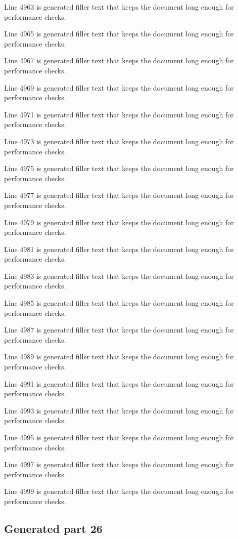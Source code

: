 Line 4963 is generated filler text that keeps the document long enough for performance checks.

Line 4965 is generated filler text that keeps the document long enough for performance checks.

Line 4967 is generated filler text that keeps the document long enough for performance checks.

Line 4969 is generated filler text that keeps the document long enough for performance checks.

Line 4971 is generated filler text that keeps the document long enough for performance checks.

Line 4973 is generated filler text that keeps the document long enough for performance checks.

Line 4975 is generated filler text that keeps the document long enough for performance checks.

Line 4977 is generated filler text that keeps the document long enough for performance checks.

Line 4979 is generated filler text that keeps the document long enough for performance checks.

Line 4981 is generated filler text that keeps the document long enough for performance checks.

Line 4983 is generated filler text that keeps the document long enough for performance checks.

Line 4985 is generated filler text that keeps the document long enough for performance checks.

Line 4987 is generated filler text that keeps the document long enough for performance checks.

Line 4989 is generated filler text that keeps the document long enough for performance checks.

Line 4991 is generated filler text that keeps the document long enough for performance checks.

Line 4993 is generated filler text that keeps the document long enough for performance checks.

Line 4995 is generated filler text that keeps the document long enough for performance checks.

Line 4997 is generated filler text that keeps the document long enough for performance checks.

Line 4999 is generated filler text that keeps the document long enough for performance checks.

\subsection{Generated part 26}

